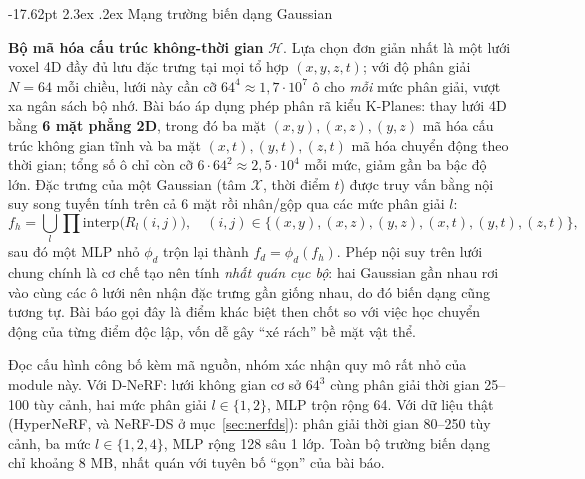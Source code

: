 \documentclass[a4paper]{report}
\makeatletter
\renewcommand\section{\@startsection{section}{1}{\z@}%
    {-17.62pt \@plus -5.89pt \@minus -1.18pt}%
    {2.3ex \@plus .2ex}%
    {\normalfont\fontsize{14.95pt}{16.31pt}\selectfont\bfseries}}
\makeatother
\begin{document}
\section{Mạng trường biến dạng Gaussian}
\label{sec:deform}

\textbf{Bộ mã hóa cấu trúc không-thời gian} $\mathcal{H}$. Lựa chọn đơn giản nhất là
một lưới voxel 4D đầy đủ lưu đặc trưng tại mọi tổ hợp $(x,y,z,t)$; với độ phân
giải $N=64$ mỗi chiều, lưới này cần cỡ $64^4 \approx 1{,}7\cdot10^7$ ô cho
\textit{mỗi} mức phân giải, vượt xa ngân sách bộ nhớ. Bài báo áp dụng phép phân
rã kiểu K-Planes: thay lưới 4D bằng \textbf{6 mặt phẳng 2D}, trong đó ba mặt
$(x,y), (x,z), (y,z)$ mã hóa cấu trúc không gian tĩnh và ba mặt
$(x,t), (y,t), (z,t)$ mã hóa chuyển động theo thời gian; tổng số ô chỉ còn cỡ
$6\cdot64^2 \approx 2{,}5\cdot10^4$ mỗi mức, giảm gần ba bậc độ lớn. Đặc trưng
của một Gaussian (tâm $\mathcal{X}$, thời điểm $t$) được truy vấn bằng nội suy
song tuyến tính trên cả 6 mặt rồi nhân/gộp qua các mức phân giải $l$:
\begin{equation}
    f_h = \bigcup_{l} \prod \mathrm{interp}\big(R_l(i,j)\big), \quad
    (i,j) \in \{(x,y),(x,z),(y,z),(x,t),(y,t),(z,t)\},
    \label{eq:hexplane}
\end{equation}
sau đó một MLP nhỏ $\phi_d$ trộn lại thành $f_d = \phi_d(f_h)$. Phép nội suy trên
lưới chung chính là cơ chế tạo nên tính \textit{nhất quán cục bộ}: hai Gaussian
gần nhau rơi vào cùng các ô lưới nên nhận đặc trưng gần giống nhau, do đó biến
dạng cũng tương tự. Bài báo gọi đây là điểm khác biệt then chốt so với việc học
chuyển động của từng điểm độc lập, vốn dễ gây ``xé rách'' bề mặt vật thể.

Đọc cấu hình công bố kèm mã nguồn, nhóm xác nhận quy mô rất nhỏ của module này.
Với D-NeRF: lưới không gian cơ sở $64^3$ cùng phân giải thời gian 25--100 tùy
cảnh, hai mức phân giải $l \in \{1,2\}$, MLP trộn rộng 64. Với dữ liệu thật
(HyperNeRF, và NeRF-DS ở mục~\ref{sec:nerfds}): phân giải thời gian 80--250 tùy
cảnh, ba mức $l \in \{1,2,4\}$, MLP rộng 128 sâu 1 lớp. Toàn bộ trường biến dạng chỉ khoảng 8 MB, nhất quán với tuyên bố
``gọn'' của bài báo.
\end{document}
